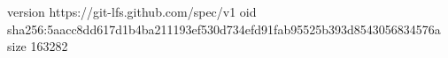 version https://git-lfs.github.com/spec/v1
oid sha256:5aacc8dd617d1b4ba211193ef530d734efd91fab95525b393d8543056834576a
size 163282
